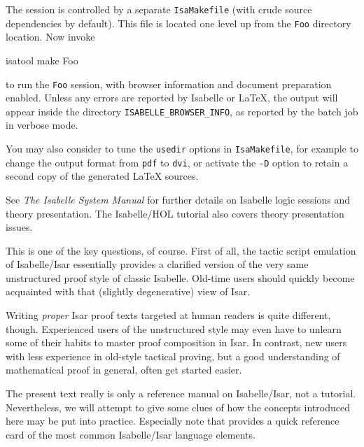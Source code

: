 \begin{isabellebody}
\begin{isamarkuptext}
  The session is controlled by a separate \verb|IsaMakefile|
  (with crude source dependencies by default).  This file is located
  one level up from the \verb|Foo| directory location.  Now
  invoke
\begin{ttbox}
  isatool make Foo
\end{ttbox}
  to run the \verb|Foo| session, with browser information and
  document preparation enabled.  Unless any errors are reported by
  Isabelle or {\LaTeX}, the output will appear inside the directory
  \verb|ISABELLE_BROWSER_INFO|, as reported by the batch job in
  verbose mode.

  \medskip You may also consider to tune the \verb|usedir|
  options in \verb|IsaMakefile|, for example to change the output
  format from \verb|pdf| to \verb|dvi|, or activate the
  \verb|-D| option to retain a second copy of the generated
  {\LaTeX} sources.

  \medskip See \emph{The Isabelle System Manual} \cite{isabelle-sys}
  for further details on Isabelle logic sessions and theory
  presentation.  The Isabelle/HOL tutorial \cite{isabelle-hol-book}
  also covers theory presentation issues.%
\end{isamarkuptext}%
\isamarkuptrue%
%
\isamarkuptrue%
%
\begin{isamarkuptext}%
This is one of the key questions, of course.  First of all, the
  tactic script emulation of Isabelle/Isar essentially provides a
  clarified version of the very same unstructured proof style of
  classic Isabelle.  Old-time users should quickly become acquainted
  with that (slightly degenerative) view of Isar.

  Writing \emph{proper} Isar proof texts targeted at human readers is
  quite different, though.  Experienced users of the unstructured
  style may even have to unlearn some of their habits to master proof
  composition in Isar.  In contrast, new users with less experience in
  old-style tactical proving, but a good understanding of mathematical
  proof in general, often get started easier.

  \medskip The present text really is only a reference manual on
  Isabelle/Isar, not a tutorial.  Nevertheless, we will attempt to
  give some clues of how the concepts introduced here may be put into
  practice.  Especially note that  provides a quick
  reference card of the most common Isabelle/Isar language elements.


\end{isamarkuptext}
\end{isabellebody}
